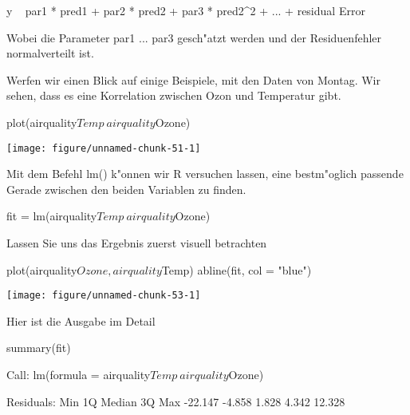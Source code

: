 \documentclass[a4paper,twoside]{tufte-book}\usepackage[]{graphicx}\usepackage[]{color}
\makeatletter
\def\maxwidth{ %
  \ifdim\Gin@nat@width>\linewidth
    \linewidth
  \else
    \Gin@nat@width
  \fi
}
\makeatother
\begin{document}
\begin{appendices}
\begin{Schunk}
\begin{Sinput}
y ~ par1 * pred1 +  par2 * pred2 +  par3 * pred2^2 + ... + residual Error
\end{Sinput}
\end{Schunk}

Wobei die Parameter par1 ... par3 gesch"atzt werden und der Residuenfehler normalverteilt ist.

Werfen wir einen Blick auf einige Beispiele, mit den Daten von Montag. Wir sehen, dass es eine Korrelation zwischen Ozon und Temperatur gibt.

\begin{Schunk}
\begin{Sinput}
plot(airquality$Temp~airquality$Ozone)
\end{Sinput}

\texttt{[image: figure/unnamed-chunk-51-1]} \end{Schunk}

Mit dem Befehl lm() k"onnen wir R versuchen lassen, eine bestm"oglich passende Gerade zwischen den beiden Variablen zu finden.

\begin{Schunk}
\begin{Sinput}
fit = lm(airquality$Temp~airquality$Ozone)
\end{Sinput}
\end{Schunk}

Lassen Sie uns das Ergebnis zuerst visuell betrachten

\begin{Schunk}
\begin{Sinput}
plot(airquality$Ozone, airquality$Temp)
abline(fit, col = "blue")
\end{Sinput}

\texttt{[image: figure/unnamed-chunk-53-1]} \end{Schunk}

Hier ist die Ausgabe im Detail

\begin{Schunk}
\begin{Sinput}
summary(fit)
\end{Sinput}
\begin{Soutput}

Call:
lm(formula = airquality$Temp ~ airquality$Ozone)

Residuals:
    Min      1Q  Median      3Q     Max 
-22.147  -4.858   1.828   4.342  12.328 


\end{Soutput}
\end{Schunk}
\end{appendices}
\end{document}
